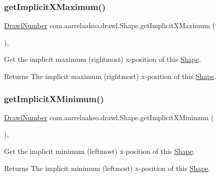 \subsubsection{\texorpdfstring{get\+Implicit\+X\+Maximum()}{getImplicitXMaximum()}}
{\footnotesize\ttfamily \hyperlink{classcom_1_1aarrelaakso_1_1drawl_1_1_drawl_number}{Drawl\+Number} com.\+aarrelaakso.\+drawl.\+Shape.\+get\+Implicit\+X\+Maximum (\begin{DoxyParamCaption}{ }\end{DoxyParamCaption})\hspace{0.3cm}{\ttfamily [protected]}, {\ttfamily [inherited]}}



Get the implicit maximum (rightmost) x-\/position of this \hyperlink{classcom_1_1aarrelaakso_1_1drawl_1_1_shape}{Shape}. 

\begin{DoxyReturn}{Returns}
The implicit maximum (rightmost) x-\/position of this \hyperlink{classcom_1_1aarrelaakso_1_1drawl_1_1_shape}{Shape}. 
\end{DoxyReturn}
\mbox{\label{classcom_1_1aarrelaakso_1_1drawl_1_1_shape_a43b7aaf82c47e231b57622b0346d3ce1}} 
\subsubsection{\texorpdfstring{get\+Implicit\+X\+Minimum()}{getImplicitXMinimum()}}
{\footnotesize\ttfamily \hyperlink{classcom_1_1aarrelaakso_1_1drawl_1_1_drawl_number}{Drawl\+Number} com.\+aarrelaakso.\+drawl.\+Shape.\+get\+Implicit\+X\+Minimum (\begin{DoxyParamCaption}{ }\end{DoxyParamCaption})\hspace{0.3cm}{\ttfamily [protected]}, {\ttfamily [inherited]}}



Get the implicit minimum (leftmost) x-\/position of this \hyperlink{classcom_1_1aarrelaakso_1_1drawl_1_1_shape}{Shape}. 

\begin{DoxyReturn}{Returns}
The implicit minimum (leftmost) x-\/position of this \hyperlink{classcom_1_1aarrelaakso_1_1drawl_1_1_shape}{Shape}. 
\end{DoxyReturn}
\mbox{\label{classcom_1_1aarrelaakso_1_1drawl_1_1_shape_ac7a69f5cb9dd954f5054a3bebc35af41}} 
